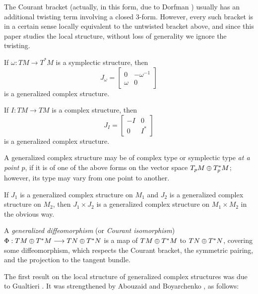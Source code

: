\documentclass{article}
\begin{document}
The Courant bracket (actually, in this form, due to Dorfman \cite{Dorfman}) usually has an additional twisting term involving a closed 3-form.  However, every such bracket is in a certain sense locally equivalent to the untwisted bracket above, and since this paper studies the local structure, without loss of generality we ignore the twisting.

\begin{example}\label{symplectic structure}
If $\omega:TM \to T^*M$ is a symplectic structure, then
$$J_\omega =
\left[\begin{array}{cc}
0 & -\omega^{-1} \\
\omega & 0
\end{array}\right]$$
is a generalized complex structure.
\end{example}

\begin{example}\label{complex structure}
If $I:TM \to TM$ is a complex structure, then
$$J_I = 
\left[\begin{array}{cc}
-I & 0 \\
0 & I^*
\end{array}\right]$$
is a generalized complex structure.
\end{example}

\begin{rem}
A generalized complex structure may be of complex type or symplectic type \emph{at a point $p$}, if it is of one of the above forms on the vector space $T_pM\oplus T^*_pM$; however, its type may vary from one point to another.
\end{rem}

\begin{example}
If $J_1$ is a generalized complex structure on $M_1$ and $J_2$ is a generalized complex structure on $M_2$, then $J_1 \times J_2$ is a generalized complex structure on $M_1 \times M_2$ in the obvious way.
\end{example}

\begin{defn}
A \emph{generalized diffeomorphism} (or \emph{Courant isomorphism}) ${\Phi : TM\oplus T^*M \longrightarrow TN\oplus T^*N}$ is a map of $TM\oplus T^*M$ to $TN \oplus T^*N$, covering some diffeomorphism, which respects the Courant bracket, the symmetric pairing, and the projection to the tangent bundle.
\end{defn}

The first result on the local structure of generalized complex structures was due to Gualtieri \cite{Gualtieri2011}.  It was strengthened by Abouzaid and Boyarchenko \cite{AbouzaidBoyarchenko}, as follows:
\end{document}
